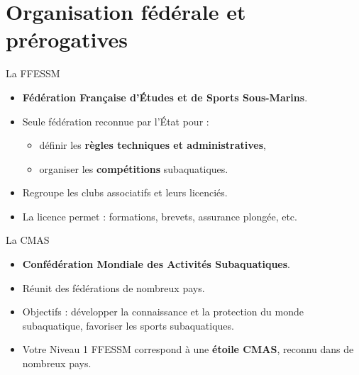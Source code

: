 \section{Organisation fédérale et prérogatives}

\begin{frame}{La FFESSM}
  \begin{itemize}
    \item \textbf{Fédération Française d’Études et de Sports Sous-Marins}.
    \item Seule fédération reconnue par l’État pour :
          \begin{itemize}
            \item définir les \textbf{règles techniques et administratives},
            \item organiser les \textbf{compétitions} subaquatiques.
          \end{itemize}
    \item Regroupe les clubs associatifs et leurs licenciés.
    \item La licence permet : formations, brevets, assurance plongée, etc.
  \end{itemize}
\end{frame}

\begin{frame}{La CMAS}
  \begin{itemize}
    \item \textbf{Confédération Mondiale des Activités Subaquatiques}.
    \item Réunit des fédérations de nombreux pays.
    \item Objectifs : développer la connaissance et la protection du monde subaquatique,
          favoriser les sports subaquatiques.
    \item Votre Niveau 1 FFESSM correspond à une \textbf{étoile CMAS},
          reconnu dans de nombreux pays.
  \end{itemize}
\end{frame}

